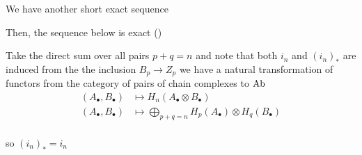 \documentclass{article}
\begin{document}
\begin{longproof}
\begin{enumerate}
        We have another short exact sequence

        \begin{center}
        \end{center}
    
        Then, the sequence below is exact ()
        \begin{center}
        \end{center}

        Take the direct sum over all pairs $p + q = n$ and note that both $i_n$ and $(i_n)_*$ are induced from the the inclusion $B_p \to Z_p$ we have a natural transformation of functors from the category of pairs of chain complexes to $\operatorname{Ab}$
        \begin{align*}
            (A_\bullet, B_\bullet) &\mapsto H_n(A_\bullet \otimes B_\bullet) \\
            (A_\bullet, B_\bullet) &\mapsto \bigoplus_{p+q=n} H_p(A_\bullet) \otimes H_q(B_\bullet) \\
        \end{align*}
        
        so $(i_n)_* = i_n$
            
        \begin{center}
        \end{center}
        

\end{enumerate}
\end{longproof}
\end{document}

